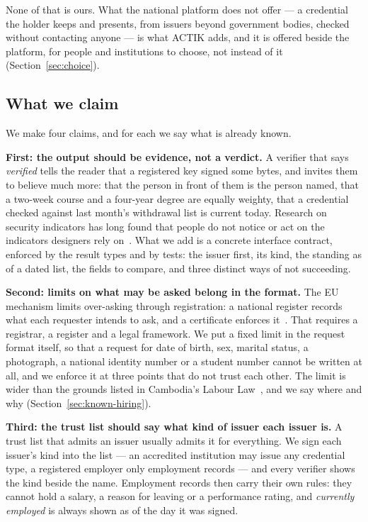 \documentclass[10pt,a4paper,twocolumn]{article}
\begin{document}
None of that is ours. What the national platform does not offer --- a credential
the holder keeps and presents, from issuers beyond government bodies, checked
without contacting anyone --- is what ACTIK adds, and it is offered beside the
platform, for people and institutions to choose, not instead of it
(Section~\ref{sec:choice}).

\subsection{What we claim}
\label{sec:claims}

We make four claims, and for each we say what is already known.

\textbf{First: the output should be evidence, not a verdict.} A verifier that
says \emph{verified} tells the reader that a registered key signed some bytes,
and invites them to believe much more: that the person in front of them is the
person named, that a two-week course and a four-year degree are equally
weighty, that a credential checked against last month's withdrawal list is
current today. Research on security indicators has long found that people do not
notice or act on the indicators designers rely on~\citep{schechter2007emperor}.
What we add is a concrete interface contract, enforced by the result types and
by tests: the issuer first, its kind, the standing as of a dated list, the fields
to compare, and three distinct ways of not succeeding.

\textbf{Second: limits on what may be asked belong in the format.} The EU
mechanism limits over-asking through registration: a national register records
what each requester intends to ask, and a certificate enforces
it~\citep{eu2025848}. That requires a registrar, a register and a legal
framework. We put a fixed limit in the request format itself, so that a request
for date of birth, sex, marital status, a photograph, a national identity number
or a student number cannot be written at all, and we enforce it at three points
that do not trust each other. The limit is wider than the grounds listed in
Cambodia's Labour Law~\citep{khlabourlaw}, and we say where and why
(Section~\ref{sec:known-hiring}).

\textbf{Third: the trust list should say what kind of issuer each issuer is.}
A trust list that admits an issuer usually admits it for everything. We sign each
issuer's kind into the list --- an accredited institution may issue any credential
type, a registered employer only employment records --- and every verifier shows
the kind beside the name. Employment records then carry their own rules: they
cannot hold a salary, a reason for leaving or a performance rating, and
\emph{currently employed} is always shown as of the day it was signed.
\end{document}
